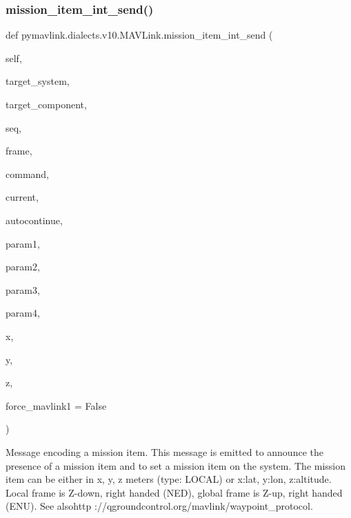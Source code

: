 \begin{DoxyVerb}
\begin{DoxyVerb}
\begin{DoxyVerb}
\begin{DoxyVerb}
\subsubsection{\texorpdfstring{mission\+\_\+item\+\_\+int\+\_\+send()}{mission\_item\_int\_send()}}
{\footnotesize\ttfamily def pymavlink.\+dialects.\+v10.\+M\+A\+V\+Link.\+mission\+\_\+item\+\_\+int\+\_\+send (\begin{DoxyParamCaption}\item[{}]{self,  }\item[{}]{target\+\_\+system,  }\item[{}]{target\+\_\+component,  }\item[{}]{seq,  }\item[{}]{frame,  }\item[{}]{command,  }\item[{}]{current,  }\item[{}]{autocontinue,  }\item[{}]{param1,  }\item[{}]{param2,  }\item[{}]{param3,  }\item[{}]{param4,  }\item[{}]{x,  }\item[{}]{y,  }\item[{}]{z,  }\item[{}]{force\+\_\+mavlink1 = {\ttfamily False} }\end{DoxyParamCaption})}

\begin{DoxyVerb}Message encoding a mission item. This message is emitted to announce
the presence of a mission item and to set a mission
item on the system. The mission item can be either in
x, y, z meters (type: LOCAL) or x:lat, y:lon,
z:altitude. Local frame is Z-down, right handed (NED),
global frame is Z-up, right handed (ENU). See alsohttp
://qgroundcontrol.org/mavlink/waypoint_protocol.


\end{DoxyVerb}
\end{DoxyVerb}
\end{DoxyVerb}
\end{DoxyVerb}
\end{DoxyVerb}
